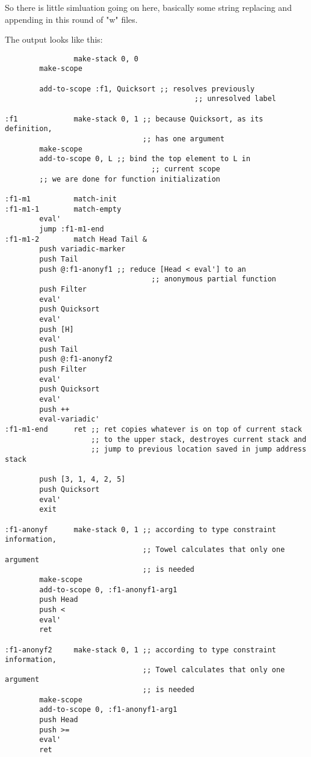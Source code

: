 \documentclass{article}
\begin{document}
So there is little simluation going on here, basically some string replacing and appending in this round of "w" files.

The output looks like this:

\begin{Verbatim}
                make-stack 0, 0
		make-scope

		add-to-scope :f1, Quicksort ;; resolves previously
                                            ;; unresolved label

:f1             make-stack 0, 1 ;; because Quicksort, as its definition,
                                ;; has one argument
		make-scope
		add-to-scope 0, L ;; bind the top element to L in
                                  ;; current scope
		;; we are done for function initialization

:f1-m1          match-init
:f1-m1-1        match-empty
		eval'
		jump :f1-m1-end
:f1-m1-2        match Head Tail &
		push variadic-marker
		push Tail
		push @:f1-anonyf1 ;; reduce [Head < eval'] to an
                                  ;; anonymous partial function
		push Filter
		eval'
		push Quicksort
		eval'
		push [H]
		eval'
		push Tail
		push @:f1-anonyf2
		push Filter
		eval'
		push Quicksort
		eval'
		push ++
		eval-variadic'
:f1-m1-end      ret ;; ret copies whatever is on top of current stack
                    ;; to the upper stack, destroyes current stack and
                    ;; jump to previous location saved in jump address stack

		push [3, 1, 4, 2, 5]
		push Quicksort
		eval'
		exit

:f1-anonyf      make-stack 0, 1 ;; according to type constraint information,
                                ;; Towel calculates that only one argument
                                ;; is needed
		make-scope
		add-to-scope 0, :f1-anonyf1-arg1
		push Head
		push <
		eval'
		ret

:f1-anonyf2     make-stack 0, 1 ;; according to type constraint information,
                                ;; Towel calculates that only one argument
                                ;; is needed
		make-scope
		add-to-scope 0, :f1-anonyf1-arg1
		push Head
		push >=
		eval'
		ret
\end{Verbatim}
\end{document}
